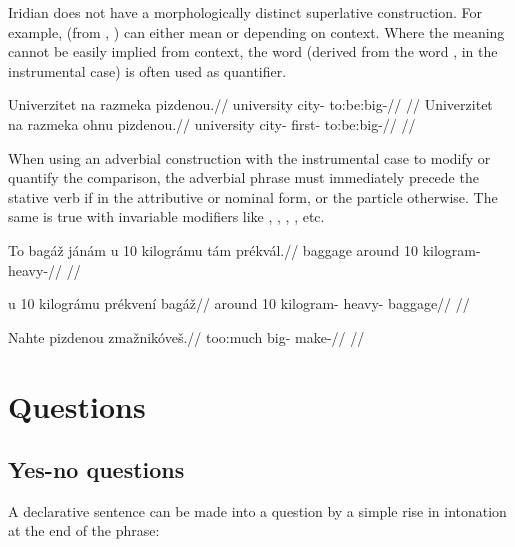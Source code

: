 Iridian does not have a morphologically distinct superlative construction. For example,  (from , ) can either mean  or  depending on context. Where the meaning cannot be easily implied from context, the word  (derived from the word ,  in the instrumental case) is often used as quantifier.

\pex
\a
\begingl
\gla Univerzitet na razmeka pizdenou.//
\glb university  city- to:be:big-//
\glft {}//
\endgl
\a
\begingl
\gla Univerzitet na razmeka ohnu pizdenou.//
\glb university  city- first- to:be:big-//
\glft {}//
\endgl
\xe

When using an adverbial construction with the instrumental case to modify or quantify the comparison, the adverbial phrase must immediately precede the stative verb if in the attributive or nominal form, or the particle  otherwise. The same is true with invariable modifiers like , , , , etc.

\ex
\begingl
\gla To bag\'a\v{z} j\'an\'am u 10 kilogr\'amu t\'am pr\'ekv\'al.//
\glb {} baggage  around 10 kilogram-  heavy-//
\glft {}//
\endgl
\xe

\ex
\begingl
\gla u 10 kilogr\'amu pr\'ekven\'i bag\'a\v{z}//
\glb around 10 kilogram- heavy- baggage//
\glft {}//
\endgl
\xe

\ex
\begingl
\gla Nahte pizdenou zma\v{z}nik\'ove\v{s}.//
\glb too:much big- make-//
\glft {}//
\endgl
\xe

\section{Questions}

\subsection{Yes-no questions}

A declarative sentence can be made into a question by a simple rise in intonation at the end of the phrase:

